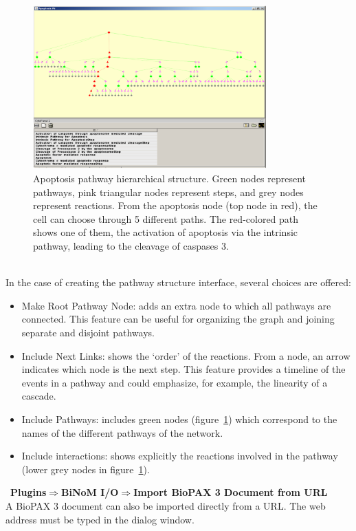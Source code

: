 \begin{figure}
\centering
\includegraphics[width=0.8\textwidth]{graphics/Apoptosis_pathway_hierarchical_structure}
\caption{Apoptosis pathway hierarchical structure. Green nodes represent pathways, pink triangular nodes represent steps, and grey nodes represent reactions. From the apoptosis node (top node in red), the cell can choose through 5 different paths. The red-colored path shows one of them, the activation of apoptosis via the intrinsic pathway, leading to the cleavage of caspases 3.}
\label{Apoptosis_pathway_hierarchical_structure}
\end{figure}
\\In the case of creating the pathway structure interface, several choices are offered:
\begin{itemize}
\item Make Root Pathway Node: adds an extra node to which all pathways are connected. This feature can be useful for organizing the graph and joining separate and disjoint pathways.
\item Include Next Links: shows the ‘order’ of the reactions. From a node, an arrow indicates which node is the next step. This feature provides a timeline of the events in a pathway and could emphasize, for example, the linearity of a cascade.
\item Include Pathways: includes green nodes (figure~\ref{Apoptosis_pathway_hierarchical_structure}) which correspond to the names of the different pathways of the network.
\item Include interactions: shows explicitly the reactions involved in the pathway (lower grey nodes in figure~\ref{Apoptosis_pathway_hierarchical_structure}).
\end{itemize}\
\textbf{Plugins$\Rightarrow$BiNoM I/O$\Rightarrow$Import BioPAX 3 Document from URL}\\
A BioPAX 3 document can also be imported directly from a URL. The web address must be typed in the dialog window.

